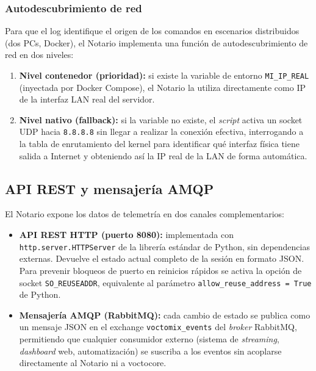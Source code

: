 \subsubsection{Autodescubrimiento de red}

Para que el log identifique el origen de los comandos en escenarios distribuidos
(dos PCs, Docker), el Notario implementa una función de autodescubrimiento de red
en dos niveles:

\begin{enumerate}
  \item \textbf{Nivel contenedor (prioridad):} si existe la variable de entorno
        \texttt{MI\_IP\_REAL} (inyectada por Docker Compose), el Notario la utiliza
        directamente como IP de la interfaz LAN real del servidor.
  \item \textbf{Nivel nativo (fallback):} si la variable no existe, el \textit{script} activa
        un socket UDP hacia \texttt{8.8.8.8} sin llegar a realizar la conexión
        efectiva, interrogando a la tabla de enrutamiento del kernel para identificar
        qué interfaz física tiene salida a Internet y obteniendo así la IP real de la
        LAN de forma automática.
\end{enumerate}

\subsection{API REST y mensajería AMQP}

El Notario expone los datos de telemetría en dos canales complementarios:

\begin{itemize}
  \item \textbf{API REST HTTP (puerto 8080):} implementada con
        \texttt{http.server.HTTPServer} de la librería estándar de Python, sin
        dependencias externas. Devuelve el estado actual completo de la sesión en
        formato JSON. Para prevenir bloqueos de puerto en reinicios rápidos se activa
        la opción de socket \texttt{SO\_REUSEADDR}, equivalente al parámetro
        \texttt{allow\_reuse\_address = True} de Python.
  \item \textbf{Mensajería AMQP (RabbitMQ):} cada cambio de estado se publica como
        un mensaje JSON en el exchange \texttt{voctomix\_events} del \textit{broker} RabbitMQ,
        permitiendo que cualquier consumidor externo (sistema de \textit{streaming}, \textit{dashboard}
        web, automatización) se suscriba a los eventos sin acoplarse directamente al
        Notario ni a voctocore.
\end{itemize}


